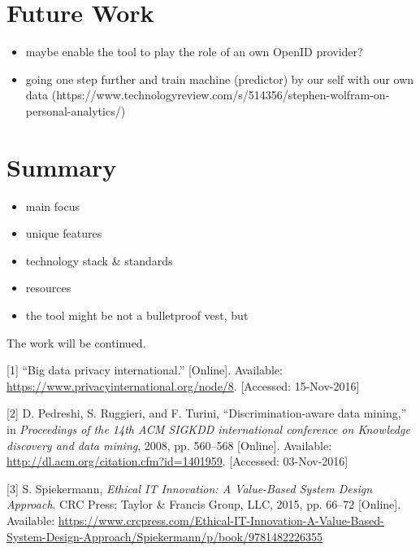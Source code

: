 \documentclass[12pt,english,a4paper,titlepage,cleardoublepage=empty,dottedtoc]{report}
\providecommand{\tightlist}{%
  \setlength{\itemsep}{0pt}\setlength{\parskip}{0pt}}
\begin{document}
\section{Future Work}\label{future-work}

\begin{itemize}
\tightlist
\item
  maybe enable the tool to play the role of an own OpenID provider?
\item
  going one step further and train machine (predictor) by our self with
  our own data
  (https://www.technologyreview.com/s/514356/stephen-wolfram-on-personal-analytics/)
\end{itemize}

\section{Summary}\label{summary}

\begin{itemize}
\tightlist
\item
  main focus
\item
  unique features
\item
  technology stack \& standards
\item
  resources
\item
  the tool might be not a bulletproof vest, but
\end{itemize}

The work will be continued.

\hypertarget{refs}{}
\hypertarget{ref-web_2016_privacy-international-about-big-data}{}
{[}1{]} ``Big data privacy international.'' {[}Online{]}. Available:
\url{https://www.privacyinternational.org/node/8}. {[}Accessed:
15-Nov-2016{]}

\hypertarget{ref-paper_2008_discrimination-aware-data-mining}{}
{[}2{]} D. Pedreshi, S. Ruggieri, and F. Turini, ``Discrimination-aware
data mining,'' in \emph{Proceedings of the 14th ACM SIGKDD international
conference on Knowledge discovery and data mining}, 2008, pp. 560--568
{[}Online{]}. Available:
\url{http://dl.acm.org/citation.cfm?id=1401959}. {[}Accessed:
03-Nov-2016{]}

\hypertarget{ref-book_2015_ethical-it-innovation_ethical-uses-of-information-and-knowledge}{}
{[}3{]} S. Spiekermann, \emph{Ethical IT Innovation: A Value-Based
System Design Approach}. CRC Press; Taylor \& Francis Group, LLC, 2015,
pp. 66--72 {[}Online{]}. Available:
\url{https://www.crcpress.com/Ethical-IT-Innovation-A-Value-Based-System-Design-Approach/Spiekermann/p/book/9781482226355}
\end{document}
